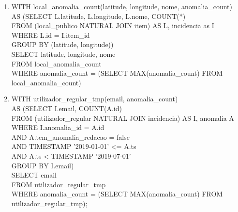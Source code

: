 \documentclass[12pt]{report}
\begin{document}
    \begin{enumerate}
        \item  WITH local\_anomalia\_count(latitude, longitude, nome, anomalia\_count)\\
               AS (SELECT L.latitude, L.longitude, L.nome, COUNT(*) \\
        \hspace*{1em} FROM (local\_publico NATURAL JOIN item) AS L, incidencia as I \\
        \hspace*{1em} WHERE L.id = I.item\_id \\
        \hspace*{1em} GROUP BY (latitude, longitude)) \\
                SELECT latitude, longitude, nome \\
                FROM local\_anomalia\_count \\
                WHERE anomalia\_count = (SELECT MAX(anomalia\_count) FROM local\_anomalia\_count)
        
        \item WITH utilizador\_regular\_tmp(email, anomalia\_count) \\
              AS (SELECT I.email, COUNT(A.id) \\
              \hspace*{1em} FROM (utilizador\_regular NATURAL JOIN incidencia) AS I, anomalia A \\
              \hspace*{1em} WHERE I.anomalia\_id = A.id \\
              \hspace*{1em} AND A.tem\_anomalia\_redacao = false \\
              \hspace*{1em} AND TIMESTAMP '2019-01-01' <= A.ts \\
              \hspace*{1em} AND A.ts < TIMESTAMP '2019-07-01' \\
              \hspace*{1em} GROUP BY I.email) \\
              SELECT email\\
              FROM utilizador\_regular\_tmp \\
              WHERE anomalia\_count = (SELECT MAX(anomalia\_count) FROM utilizador\_regular\_tmp);


\end{enumerate}
\end{document}
